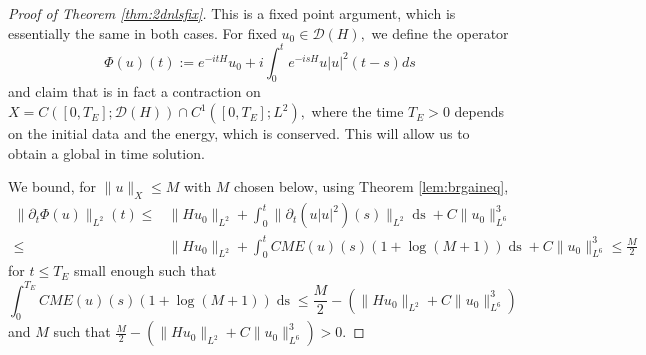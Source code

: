 \documentclass[11pt, oneside]{article}   	%
\newcommand{\assign}{:=}
\newcommand{\tmop}[1]{\ensuremath{\operatorname{#1}}}
\begin{document}
\begin{proof}[Proof of Theorem \ref{thm:2dnlsfix}]
	This is a fixed point argument, which is essentially the same in both cases. For fixed $u_0 \in \mathscr{D} (H),$ we define the operator
	\[ \Phi (u) (t) \assign e^{- i t H} u_0 + i \int_{0}^{t} e^{-
		i s H} u | u |^2 (t - s) d s \]
	and claim that is in fact a contraction on $X = C ([0, T_E] ; \mathscr{D} (H))
	\cap C^1 ([0, T_E] ; L^2),$ where the time $T_E > 0$ depends on the initial data and  the energy,
	which is conserved. This will allow us to obtain a global in time solution.
	
	We bound, for $\| u \|_X \le M$ with $M$ chosen below, using  Theorem \ref{lem:brgaineq},
	\begin{align*}
	\| \partial_t \Phi (u) \|_{L^2} (t)\le& \| H u_0 \|_{L^2} +
	\int_{0}^{t} \|\partial_t(u|u|^2)(s)\|_{L^2} \tmop{ds} + C\|
	u_0 \|^3_{L^6} 
	\\
	\le & \| H u_0 \|_{L^2} +
	\int_{0}^{t} C M E (u) (s) (1 + \log (M+1)) \tmop{ds} + C\|
	u_0 \|^3_{L^6}
	\le \frac{M}{2}
	\end{align*}
	for $t \le T_E$ small enough such that \[\int_{0}^{T_E} C M E (u) (s) (1 +  \log (M+1)) \tmop{ds}\le \frac{M}{2}-(\| H u_0 \|_{L^2}+C\|u_0 \|^3_{L^6})\] and $M$ such that $\frac{M}{2}-(\| H u_0 \|_{L^2}+C\|u_0 \|^3_{L^6})>0.$
	

\end{proof}
\end{document}
